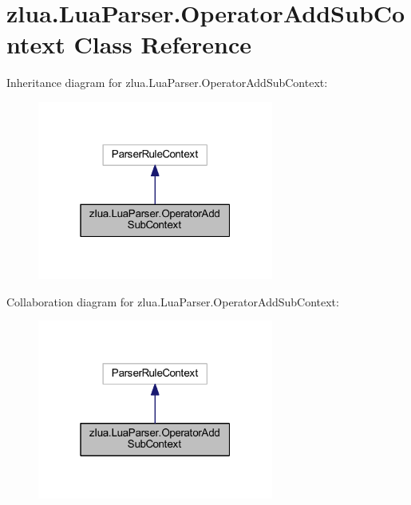 \hypertarget{classzlua_1_1_lua_parser_1_1_operator_add_sub_context}{}\section{zlua.\+Lua\+Parser.\+Operator\+Add\+Sub\+Context Class Reference}
\label{classzlua_1_1_lua_parser_1_1_operator_add_sub_context}


Inheritance diagram for zlua.\+Lua\+Parser.\+Operator\+Add\+Sub\+Context\+:
\nopagebreak
\begin{figure}[H]
\begin{center}
\leavevmode
\includegraphics[width=220pt]{classzlua_1_1_lua_parser_1_1_operator_add_sub_context__inherit__graph}
\end{center}
\end{figure}


Collaboration diagram for zlua.\+Lua\+Parser.\+Operator\+Add\+Sub\+Context\+:
\nopagebreak
\begin{figure}[H]
\begin{center}
\leavevmode
\includegraphics[width=220pt]{classzlua_1_1_lua_parser_1_1_operator_add_sub_context__coll__graph}
\end{center}
\end{figure}
